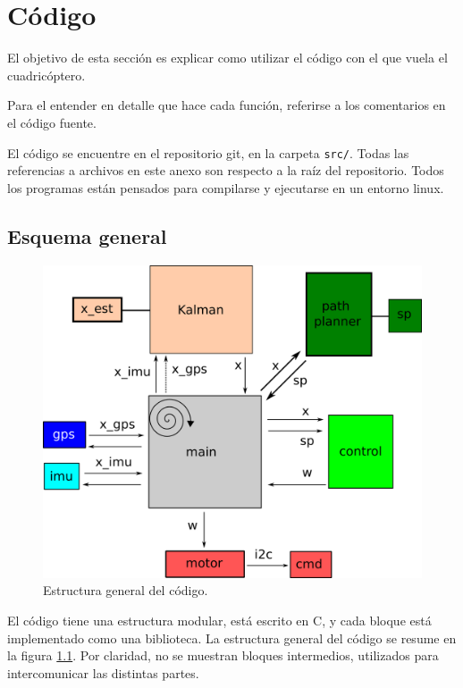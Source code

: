 \documentclass[main]{subfiles}
\begin{document}
\chapter{Código}
\label{chap:codigo}

El objetivo de esta sección es explicar como utilizar el código con el que vuela el cuadricóptero.

Para el entender en detalle que hace cada función, referirse a los comentarios en el código fuente.

El código se encuentre en el repositorio git, en la carpeta \verb+src/+. Todas las referencias a archivos en este anexo son respecto a la raíz del repositorio. Todos los programas están pensados para compilarse y ejecutarse en un entorno linux.

\section{Esquema general}
\label{sec:codigo:esquema-general}

\begin{figure}
\vspace{-20pt}
\centering
  \includegraphics{./pics_codigo/code.png}
\caption{Estructura general del código.}
\vspace{-20pt}
\label{fig:codigo:code.png}
\end{figure}

El código tiene una estructura modular, está escrito en C, y cada bloque está implementado como una biblioteca. La estructura general del código se resume en la figura \ref{fig:codigo:code.png}. Por claridad, no se muestran bloques intermedios, utilizados para intercomunicar las distintas partes.
\end{document}
